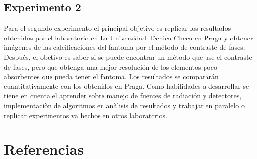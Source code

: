 \documentclass[notitlepage,letterpaper,12pt]{article} %
\begin{document}
\subsection{Experimento 2}
Para el segundo experimento el principal objetivo es replicar los resultados obtenidos por el laboratorio en La Universidad Técnica Checa en Praga y obtener imágenes de las calcificaciones del fantoma por el método de contraste de fases. Después, el obetivo es saber si se puede encontrar un método que use el contraste de fases, pero que obtenga una mejor resolución de los elementos poco absorbentes que pueda tener el fantoma. Los resultados se compararán cuantitativamente con los obtenidos en Praga. Como habilidades a desarrollar se tiene en cuenta el aprender sobre manejo de fuentes de radiación y detectores, implementaciòn de algoritmos en anàlisis de resultados y trabajar en paralelo o replicar experimentos ya hechos en otros laboratorios.






\section{Referencias}









\end{document}
